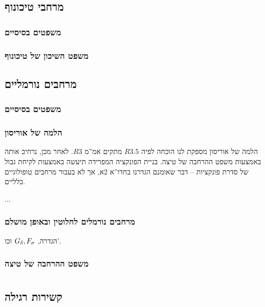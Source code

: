 \documentclass[name=רשימות טופולוגיה כללית]{../../../tex/classes/noChapterMegasumPreamble}
\begin{document}
	\subsection{\label{ss:t3.5}מרחבי טיכונוף}
	\subsubsection{משפטים בסיסיים}
	\subsubsection{\label{sss:cube}משפט השיכון של טיכונוף}
	\subsection{\label{ss:t4}מרחבים נורמליים}
	\subsubsection{משפטים בסיסיים}
	\subsubsection{\label{sss:urysohnsLemma}הלמה של אוריסון}
	הלמה של אוריסון מספקת לנו הוכחה לפיה $R3.5$ מתקים אמ''מ $R3$. לאחר מכן, נרחיב אותה באמצעות משפט ההרחבה של טיצה. בניית הפונקציה המפרידה תיעשה באמצעות לקיחת גבול של סדרת פונקציות – דבר שאומנם הגדרנו בחדו''א 2א, אך לא בעבור מרחבים טופולוגיים כלליים. 
	\begin{Theorem}\label{theo:urysohn}
		...
	\end{Theorem}
	\subsubsection{\label{sss:t5-t6}מרחבים נורמלים לחלוטין ובאופן מושלם}
	הגדרה, $G_\delta, F_\sigma$ וכו'. 
	\subsubsection{משפט ההרחבה של טיצה}
	
	\npage
	\section[קשירות]{\label{s:connectedness}}
	\subsection{\label{ss:connectedness}קשירות רגילה}
\end{document}
